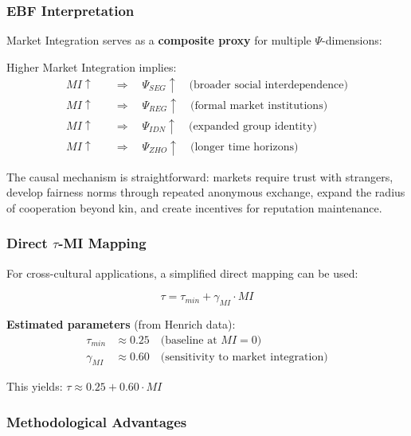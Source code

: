 \subsubsection{EBF Interpretation}

Market Integration serves as a \textbf{composite proxy} for multiple $\Psi$-dimensions:

\begin{proposition}[MI Decomposition]
\label{prop:mi-decomposition}
Higher Market Integration implies:
\begin{align}
MI \uparrow \quad &\Rightarrow \quad \Psi_{SEG} \uparrow \quad \text{(broader social interdependence)} \\
MI \uparrow \quad &\Rightarrow \quad \Psi_{REG} \uparrow \quad \text{(formal market institutions)} \\
MI \uparrow \quad &\Rightarrow \quad \Psi_{IDN} \uparrow \quad \text{(expanded group identity)} \\
MI \uparrow \quad &\Rightarrow \quad \Psi_{ZHO} \uparrow \quad \text{(longer time horizons)}
\end{align}
\end{proposition}

The causal mechanism is straightforward: markets require trust with strangers, develop fairness norms through repeated anonymous exchange, expand the radius of cooperation beyond kin, and create incentives for reputation maintenance.

\subsubsection{Direct $\tau$-MI Mapping}

For cross-cultural applications, a simplified direct mapping can be used:

\begin{equation}
\boxed{\tau = \tau_{min} + \gamma_{MI} \cdot MI}
\end{equation}

\textbf{Estimated parameters} (from Henrich data):
\begin{align}
\tau_{min} &\approx 0.25 \quad \text{(baseline at } MI = 0\text{)} \\
\gamma_{MI} &\approx 0.60 \quad \text{(sensitivity to market integration)}
\end{align}

This yields: $\tau \approx 0.25 + 0.60 \cdot MI$

\subsubsection{Methodological Advantages}

